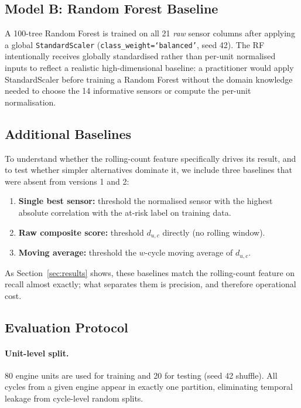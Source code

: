\documentclass[10pt,twocolumn]{article}
\begin{document}
\subsection{Model B: Random Forest Baseline}

A 100-tree Random Forest is trained on all 21 \emph{raw} sensor columns after
applying a global \texttt{StandardScaler} (\texttt{class\_weight=`balanced'}, seed 42).
The RF intentionally receives globally standardised rather than per-unit normalised
inputs to reflect a realistic high-dimensional baseline: a practitioner would apply
StandardScaler before training a Random Forest without the domain knowledge needed
to choose the 14 informative sensors or compute the per-unit normalisation.

\subsection{Additional Baselines}

To understand whether the rolling-count feature specifically drives its result, and
to test whether simpler alternatives dominate it, we include three baselines that
were absent from versions 1 and 2:
\begin{enumerate}[label=(\alph*)]
  \item \textbf{Single best sensor:} threshold the normalised sensor with the highest
        absolute correlation with the at-risk label on training data.
  \item \textbf{Raw composite score:} threshold $d_{u,c}$ directly (no rolling window).
  \item \textbf{Moving average:} threshold the $w$-cycle moving average of $d_{u,c}$.
\end{enumerate}
As Section~\ref{sec:results} shows, these baselines match the rolling-count feature on
recall almost exactly; what separates them is precision, and therefore operational
cost.

\subsection{Evaluation Protocol}

\paragraph{Unit-level split.}
80 engine units are used for training and 20 for testing (seed 42 shuffle).
All cycles from a given engine appear in exactly one partition, eliminating
temporal leakage from cycle-level random splits.
\end{document}
